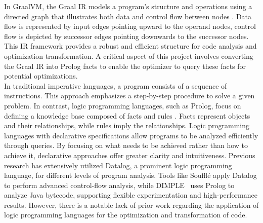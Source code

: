 In GraalVM, the Graal IR models a program's structure and operations using a directed graph that illustrates both data and control flow between nodes \cite{Graal2021}. Data flow is represented by input edges pointing upward to the operand nodes, control flow is depicted by successor edges pointing downwards to the successor nodes. This IR framework provides a robust and efficient structure for code analysis and optimization transformation. A critical aspect of this project involves converting the Graal IR into Prolog facts to enable the optimizer to query these facts for potential optimizations. \\

In traditional imperative languages, a program consists of a sequence of instructions. This approach emphasizes a step-by-step procedure to solve a given problem. In contrast, logic programming languages, such as Prolog, focus on defining a knowledge base composed of facts and rules \cite{Bramer2013}. Facts represent objects and their relationships, while rules imply the relationships. Logic programming languages with declarative specifications allow programs to be analyzed efficiently through queries. By focusing on what needs to be achieved rather than how to achieve it, declarative approaches offer greater clarity and intuitiveness. Previous research has extensively utilized Datalog, a prominent logic programming language, for different levels of program analysis.
Tools like Soufflé \cite{silverman2021wantanalyzeschemeprograms} apply Datalog to perform advanced control-flow analysis, while DIMPLE~\cite{Benton2007} uses Prolog to analyze Java bytecode, supporting flexible experimentation and high-performance results.
However, there is a notable lack of prior work regarding the application of logic programming languages for the optimization and transformation of code. 